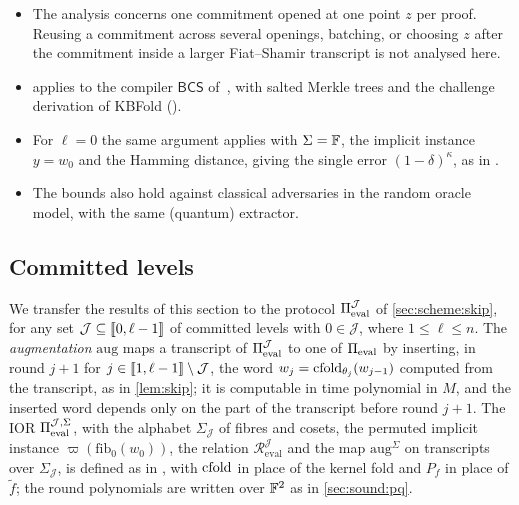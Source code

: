 \begin{remark}[Scope]\label{rem:fs}
\begin{itemize}
  \item The analysis concerns one commitment opened at one point $z$ per proof. Reusing a commitment across several openings, batching, or choosing $z$ after the commitment inside a larger Fiat--Shamir transcript is not analysed here.
  \item {} applies to the compiler $\mathsf{BCS}$ of~\cite[Construction~11.7]{CDHZ25}, with salted Merkle trees and the challenge derivation of KBFold ().
  \item For $\ell = 0$ the same argument applies with $\Sigma = \mathbb{F}$, the implicit instance $y = w_0$ and the Hamming distance, giving the single error $(1-\delta)^{\kappa}$, as in .
  \item The bounds also hold against classical adversaries in the random oracle model, with the same (quantum) extractor.
\end{itemize}
\end{remark}

\subsection{Committed levels}\label{sec:sound:skip}

We transfer the results of this section to the protocol $\Pi_{\mathrm{eval}}^{\mathcal{J}}$ of \cref{sec:scheme:skip}, for any set $\mathcal{J} \subseteq \llbracket 0, \ell-1 \rrbracket$ of committed levels with $0 \in \mathcal{J}$, where $1 \le \ell \le n$.
The \emph{augmentation} $\mathrm{aug}$ maps a transcript of $\Pi_{\mathrm{eval}}^{\mathcal{J}}$ to one of $\Pi_{\mathrm{eval}}$ by inserting, in round $j+1$ for $j \in \llbracket 1, \ell-1 \rrbracket \setminus \mathcal{J}$, the word $w_j = \mathrm{cfold}_{\theta_j}(w_{j-1})$ computed from the transcript, as in \cref{lem:skip}; it is computable in time polynomial in $M$, and the inserted word depends only on the part of the transcript before round $j+1$.
The IOR $\Pi_{\mathrm{eval}}^{\mathcal{J},\Sigma}$, with the alphabet $\Sigma_{\mathcal{J}}$ of fibres and cosets, the permuted implicit instance $\varpi(\mathrm{fib}_0(w_0))$, the relation $\mathcal{R}^{\mathcal{J}}_{\mathrm{eval}}$ and the map $\mathrm{aug}^{\Sigma}$ on transcripts over $\Sigma_{\mathcal{J}}$, is defined as in , with $\mathrm{cfold}$ in place of the kernel fold and $P_f$ in place of $\tilde f$; the round polynomials are written over $\mathbb{F}^2$ as in \cref{sec:sound:pq}.

